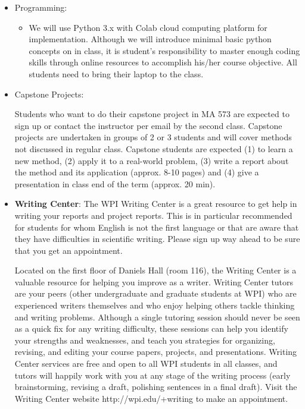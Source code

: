 \documentclass[11pt]{amsart}
\begin{document}
\begin{itemize}
\item Programming: 
\begin{itemize}
 \item We will use Python 3.x with Colab cloud computing platform for implementation. Although we will introduce minimal basic python concepts on in class, it is student's responsibility to master enough coding skills  through online resources to accomplish 
his/her course objective. All students need to bring their laptop to the class.

\end{itemize}





\item {Capstone Projects}: 
\begin{itemize}
 Students who want to do their capstone project in MA 573 are expected to sign up  or contact the instructor per email by  the second class. Capstone projects are undertaken in groups of 2 or 3 students and will cover methods not discussed in regular class. Capstone students are expected (1) to learn a new method, (2) apply it to a real-world problem, (3) write a report about the method and its application (approx. 8-10 pages) and (4) give a presentation in class end of the term (approx. 20 min).

\end{itemize}



\item \textbf{Writing Center}: The WPI Writing Center is a great resource to get help in writing your reports and project reports. This is in particular recommended for students for whom English is not the first language or that are aware that they have difficulties in scientific writing. Please sign up way ahead to be sure that you get an appointment.

Located on the first floor of Daniels Hall (room 116), the Writing Center is a valuable resource for helping you improve as a writer. Writing Center tutors are your peers (other undergraduate and graduate students at WPI) who are experienced writers themselves and who enjoy helping others tackle thinking and writing problems. Although a single tutoring session should never be seen as a quick fix for any writing difficulty, these sessions can help you identify your strengths and weaknesses, and teach you strategies for organizing, revising, and editing your course papers, projects, and presentations. Writing Center services are free and open to all WPI students in all classes, and tutors will happily work with you at any stage of the writing process (early brainstorming, revising a draft, polishing sentences in a final draft). Visit the Writing Center website 
{http://wpi.edu/+writing} to make an appointment.



\end{itemize}
\end{document}
